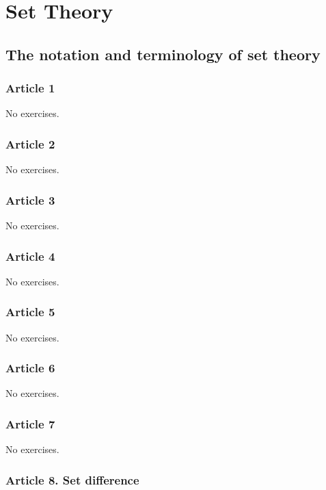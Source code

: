 \chapter{Set Theory}

\section{The notation and terminology of set theory}


\subsection{Article 1}

No exercises.

\subsection{Article 2}

No exercises.

\subsection{Article 3}

No exercises.

\subsection{Article 4}

No exercises.

\subsection{Article 5}

No exercises.

\subsection{Article 6}

No exercises.

\subsection{Article 7}

No exercises.

\subsection{Article 8. Set difference}
